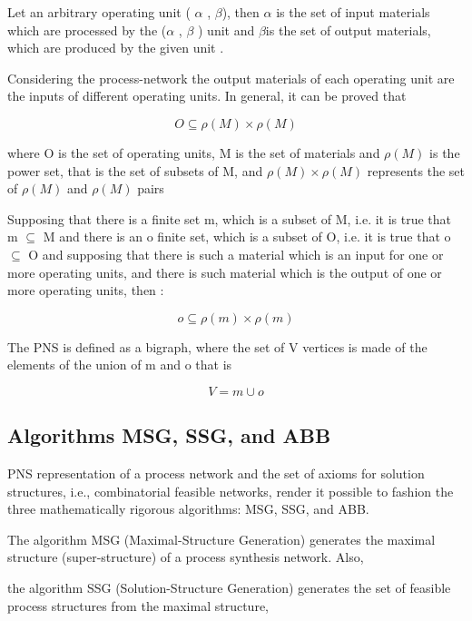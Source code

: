 Let an arbitrary operating unit ( $\alpha$ , $\beta$), then $\alpha$ is the set of input materials which are processed by the 
($\alpha$ , $\beta$ ) unit and $\beta$is the set of output materials, which are produced by the given unit .


Considering the process-network the output materials of each operating unit are the inputs of different operating units. In general, it can be proved that 

\begin{equation}
O\subseteq \rho(M) \times  \rho(M)\label{eq:second}
\end{equation}

where O is the set of operating units, M is the set of materials and $\rho(M)$ is the power set, 
that is the set of subsets of M, and $\rho(M) \times  \rho(M)$ represents the set of $\rho(M)$ and $\rho(M)$ pairs

Supposing that there is a finite set m, which is a subset of M, i.e. it is true that m $\subseteq$ M 
and there is an o finite set, which is a subset of O, i.e. 
it is true that o $\subseteq$ O and supposing that there is such a material
which is an input for one or more operating units, and there is such material 
which is the output of one or more operating units, then :

\begin{equation}
o\subseteq \rho(m) \times  \rho(m)\label{eq:second}
\end{equation}


The PNS is defined as a bigraph, where the set of V vertices is made of the elements of the union of m and o that is

\begin{equation}
V = m \cup o\label{eq:nex}
\end{equation}
 
 

\subsection{ Algorithms MSG, SSG, and ABB }
PNS representation of a process network and the set of  axioms for solution structures, i.e.,
combinatorial feasible networks, render it possible to fashion the three mathematically rigorous algorithms:
MSG, SSG, and ABB. 

The algorithm MSG (Maximal-Structure Generation) generates the maximal structure (super-structure)
of a process synthesis network.
Also, 

the algorithm SSG (Solution-Structure Generation) generates the set of feasible process structures from the maximal structure,

